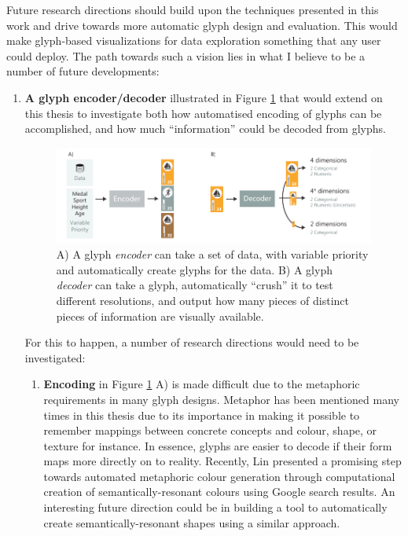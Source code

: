 Future research directions should build upon the techniques presented in this work and drive towards more automatic glyph design and evaluation.
This would make glyph-based visualizations for data exploration something that any user could deploy.
The path towards such a vision lies in what I believe to be a number of future developments:
\begin{enumerate}
\item \textbf{A glyph encoder/decoder} illustrated in Figure \ref{fig:encode_decode} that would extend on this thesis to investigate both how automatised encoding of glyphs can be accomplished, and how much ``information'' could be decoded from glyphs.

\begin{figure}[t!]
\includegraphics[width=\textwidth]{images/conclusion/encode_decode}
\caption{A) A glyph \emph{encoder} can take a set of data, with variable priority and automatically create glyphs for the data.
B) A glyph \emph{decoder} can take a glyph, automatically ``crush'' it to test different resolutions, and output how many pieces of distinct pieces of information are visually available.}
\label{fig:encode_decode}
\end{figure}

For this to happen, a number of research directions would need to be investigated:
\begin{enumerate}
 \item \textbf{Encoding} in Figure \ref{fig:encode_decode} A) is made difficult due to the metaphoric requirements in many glyph designs.
Metaphor has been mentioned many times in this thesis due to its importance in making it possible to remember mappings between concrete concepts and colour, shape, or texture for instance.
In essence, glyphs are easier to decode if their form maps more directly on to reality.
Recently, Lin \etal \cite{lin2013selecting} presented a promising step towards automated metaphoric colour generation through computational creation of semantically-resonant colours using Google search results.
An interesting future direction could be in building a tool to automatically create semantically-resonant shapes using a similar approach.


\end{enumerate}
\end{enumerate}
